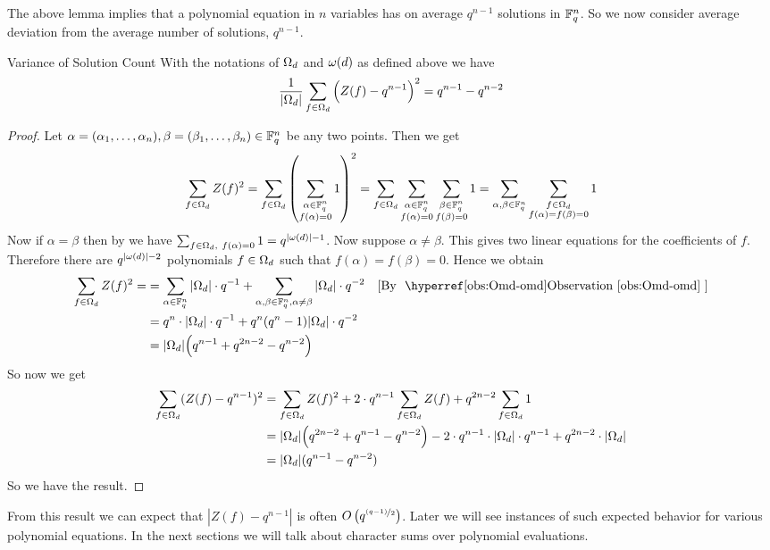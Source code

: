 The above lemma implies that a polynomial equation in $n$ variables has on average $q^{n-1}$ solutions in $\mathbb{F}_q^n$. So we now consider average deviation from the average number of solutions, $q^{n-1}$. 
\begin{Theorem}{Variance of Solution Count}{}
  With the notations of $\Omega_d$ and $\omega(d)$ as defined above we have
  $$\frac1{|\Omega_d|}\sum_{f\in\Omega_d}\Big(Z(f)-q^{n-1}\Big)^2=q^{n-1}-q^{n-2}$$
\end{Theorem}
\begin{proof}
  Let $\alpha=(\alpha_1,\dots,\alpha_n),\beta=(\beta_1,\dots,\beta_n)\in\mathbb{F}_q^n$ be any two points. Then we get
  $$\sum_{f\in\Omega_d}Z(f)^2  = \sum_{f\in\Omega_d}\left( \sum_{\substack{\alpha\in\mathbb{F}_q^n\\ f(\alpha)=0}} 1 \right)^2= \sum_{f\in\Omega_d}\sum_{\substack{\alpha\in\mathbb{F}_q^n\\ f(\alpha)=0}}\sum_{\substack{\beta\in\mathbb{F}_q^n\\ f(\beta)=0}}1=\sum_{\alpha,\beta\in\mathbb{F}_q^n}\sum_{\substack{f\in\Omega_d\\  f(\alpha)=f(\beta)=0}}1$$
  Now if $\alpha=\beta$ then by  we have $\sum_{f\in\Omega_d,\   f(\alpha)=0}1=q^{|\omega(d)|-1}$. Now suppose $\alpha\neq\beta$. This gives two linear equations for the coefficients of $f$. Therefore there are $q^{|\omega(d)|-2}$ polynomials $f\in\Omega_d$ such that $f(\alpha)=f(\beta)=0$. Hence we obtain \begin{align*}
    \sum_{f\in\Om_d}Z(f)^2  =  & = \sum_{\alpha\in\bbF_q^n}|\Om_d|\cdot q^{-1}+\sum_{\alpha,\beta\in\bbF_q^n,\alpha\neq \beta}|\Om_d|\cdot q^{-2} \byo{Omd-omd}\\ 
    & = q^n\cdot |\Om_d|\cdot q^{-1}+q^n(q^n-1)|\Om_d|\cdot q^{-2}\\ 
    & = |\Om_d|\Big( q^{n-1}+q^{2n-2}-q^{n-2} \Big)
  \end{align*}
  So now we get \begin{align*}
    \sum_{f\in\Omega_d}(Z(f)-q^{n-1})^2 & = \sum_{f\in\Omega_d}Z(f)^2 + 2\cdot q^{n-1}\sum_{f\in\Omega_d}Z(f)+q^{2n-2}\sum_{f\in\Omega_d}1\\ 
    & = |\Omega_d|\Big(q^{2n-2}+q^{n-1}-q^{n-2}\Big)-2\cdot q^{n-1}\cdot |\Omega_d|\cdot q^{n-1}+q^{2n-2}\cdot |\Omega_d|\\ 
    & = |\Omega_d|(q^{n-1}-q^{n-2})
  \end{align*}
  So we have the result. 
\end{proof}
From this result we can expect that $|Z(f)-q^{n-1}|$ is often $O\left(q^{\nicefrac{(q-1)}{2}}\right)$. Later we will see instances of such expected behavior for various polynomial equations. In the next sections we will talk about character sums over polynomial evaluations. 
